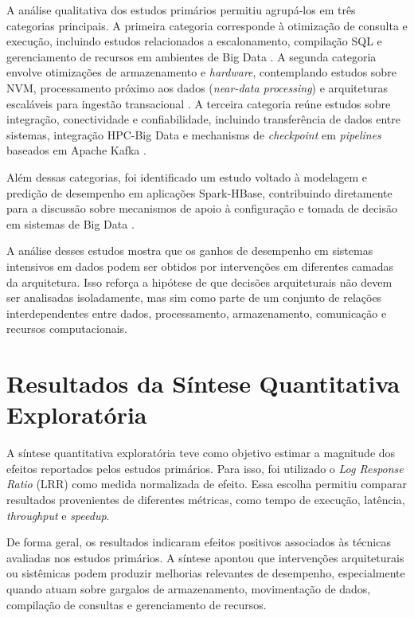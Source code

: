 A análise qualitativa dos estudos primários permitiu agrupá-los em três categorias principais. A primeira categoria corresponde à otimização de consulta e execução, incluindo estudos relacionados a escalonamento, compilação SQL e gerenciamento de recursos em ambientes de Big Data \cite{wang2018hard,schiavio2020dynamic,lyu2022fine}. A segunda categoria envolve otimizações de armazenamento e \textit{hardware}, contemplando estudos sobre NVM, processamento próximo aos dados (\textit{near-data processing}) e arquiteturas escaláveis para ingestão transacional \cite{gotze2018nvm-aware,vincon2020nkv,li2022karst}. A terceira categoria reúne estudos sobre integração, conectividade e confiabilidade, incluindo transferência de dados entre sistemas, integração HPC-Big Data e mechanisms de \textit{checkpoint} em \textit{pipelines} baseados em Apache Kafka \cite{haynes2016pipegen,ponce2019upgrading,aung2019coordinate}.

Além dessas categorias, foi identificado um estudo voltado à modelagem e predição de desempenho em aplicações Spark-HBase, contribuindo diretamente para a discussão sobre mecanismos de apoio à configuração e tomada de decisão em sistemas de Big Data \cite{alquwaiee2022performance}.

A análise desses estudos mostra que os ganhos de desempenho em sistemas intensivos em dados podem ser obtidos por intervenções em diferentes camadas da arquitetura. Isso reforça a hipótese de que decisões arquiteturais não devem ser analisadas isoladamente, mas sim como parte de um conjunto de relações interdependentes entre dados, processamento, armazenamento, comunicação e recursos computacionais.

\section{Resultados da Síntese Quantitativa Exploratória}
\label{sec:resultados-sintese-quantitativa}

A síntese quantitativa exploratória teve como objetivo estimar a magnitude dos efeitos reportados pelos estudos primários. Para isso, foi utilizado o \textit{Log Response Ratio} (LRR) como medida normalizada de efeito. Essa escolha permitiu comparar resultados provenientes de diferentes métricas, como tempo de execução, latência, \textit{throughput} e \textit{speedup}.

De forma geral, os resultados indicaram efeitos positivos associados às técnicas avaliadas nos estudos primários. A síntese apontou que intervenções arquiteturais ou sistêmicas podem produzir melhorias relevantes de desempenho, especialmente quando atuam sobre gargalos de armazenamento, movimentação de dados, compilação de consultas e gerenciamento de recursos.


